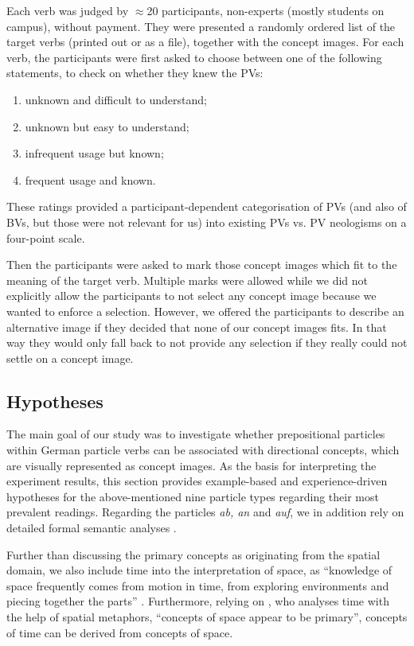 \documentclass[output=paper]{langsci/langscibook}
\begin{document}
Each verb was judged by $\approx$20 participants, non-experts (mostly
students on campus), without payment. They were presented a randomly
ordered list of the target verbs (printed out or as a file), together
with the concept images. For each verb, the participants were first
asked to choose between one of the following statements, to check on
whether they knew the PVs:
\begin{enumerate}
  \itemsep -1mm
\item unknown and difficult to understand;
\item unknown but easy to understand;
\item infrequent usage but known;
\item frequent usage and known.
\end{enumerate}
These ratings provided a participant-dependent categorisation of PVs
(and also of BVs, but those were not relevant for us) into existing
PVs vs. PV neologisms on a four-point scale.

Then the participants were asked to mark those concept images which
fit to the meaning of the target verb. Multiple marks were allowed
while we did not explicitly allow the participants to not select any
concept image because we wanted to enforce a selection. However, we
offered the participants to describe an alternative image if they
decided that none of our concept images fits. In that way they would
only fall back to not provide any selection if they really could not
settle on a concept image.


\subsection{Hypotheses}

The main goal of our study was to investigate whether prepositional
particles within German particle verbs can be associated with
directional concepts, which are visually represented as concept
images. As the basis for interpreting the experiment results, this
section provides example-based and experience-driven hypotheses for
the above-mentioned nine particle types regarding their most prevalent
readings. Regarding the particles \textit{ab, an} and \textit{auf}, we
in addition rely on detailed formal semantic analyses
\citep{Lechler/Rossdeutscher:09, Kliche:11,Springorum:11}.

Further than discussing the primary concepts as originating from the
spatial domain, we also include time into the interpretation of space,
as ``knowledge of space frequently comes from motion in time, from
exploring environments and piecing together the parts''
\citep{Tversky:11}. Furthermore, relying on \cite{Boroditsky:01}, who
analyses time with the help of spatial metaphors, ``concepts of space
appear to be primary'', concepts of time can be derived from concepts
of space.
\end{document}

